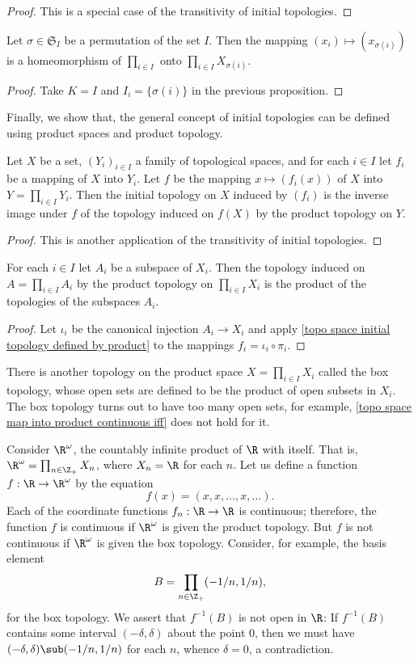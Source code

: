 \begin{proof}
This is a special case of the transitivity of initial topologies.
\end{proof}
\begin{corollary}
Let $\sigma\in\mathfrak{S}_I$ be a permutation of the set $I$. Then the mapping $(x_i)\mapsto(x_{\sigma(i)})$ is a homeomorphism of $\prod_{i\in I}$ onto $\prod_{i\in I}X_{\sigma(i)}$.
\end{corollary}
\begin{proof}
Take $K=I$ and $I_i=\{\sigma(i)\}$ in the previous proposition.
\end{proof}
Finally, we show that, the general concept of initial topologies can be defined using product spaces and product topology.
\begin{proposition}\label{topo space initial topology defined by product}
Let $X$ be a set, $(Y_i)_{i\in I}$ a family of topological spaces, and for each $i\in I$ let $f_i$ be a mapping of $X$ into $Y_i$. Let $f$ be the mapping $x\mapsto(f_i(x))$ of $X$ into $Y=\prod_{i\in I}Y_i$. Then the initial topology on $X$ induced by $(f_i)$ is the inverse image under $f$ of the topology induced on $f(X)$ by the product topology on $Y$.
\end{proposition}
\begin{proof}
This is another application of the transitivity of initial topologies.
\end{proof}
\begin{corollary}
For each $i\in I$ let $A_i$ be a subspace of $X_i$. Then the topology induced on $A=\prod_{i\in I}A_i$ by the product topology on $\prod_{i\in I}X_i$ is the product of the topologies of the subspaces $A_i$.
\end{corollary}
\begin{proof}
Let $\iota_i$ be the canonical injection $A_i\to X_i$ and apply \cref{topo space initial topology defined by product} to the mappings $f_i=\iota_i\circ\pi_i$.
\end{proof}
There is another topology on the product space $X=\prod_{i\in I}X_i$ called the box topology, whose open sets are defined to be the product of open subsets in $X_i$. The box topology turns out to have too many open sets, for example, \cref{topo space map into product continuous iff} does not hold for it.
\begin{example}
Consider $\R^\omega$, the countably infinite product of $\R$ with itself. That is, $\R^\omega=\prod_{n\in\Z_+}X_n$, where $X_n=\R$ for each $n$. Let us define a function $f:\R\to\R^\omega$ by the equation
\[f(x)=(x,x,\dots,x,\dots).\]
Each of the coordinate functions $f_n:\R\to\R$ is continuous; therefore, the function $f$ is continuous if $\R^\omega$ is given the product topology. But $f$ is not continuous if $\R^\omega$ is given the box topology. Consider, for example, the basis element
\[B=\prod_{n\in\Z_+}(-1/n,1/n),\]
for the box topology. We assert that $f^{-1}(B)$ is not open in $\R$: If $f^{-1}(B)$ contains some interval $(-\delta,\delta)$ about the point $0$, then we must have $(-\delta,\delta)\sub(-1/n,1/n)$ for each $n$, whence $\delta=0$, a contradiction.
\end{example}
